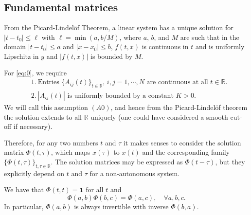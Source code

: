 \documentclass[a4paper,11pt]{article}
\newcounter{Theorem}
\theoremstyle{remark}
\begin{document}

\subsection{Fundamental matrices}


From the Picard-Lindel\"{o}f Theorem, a linear system has a unique solution for $|t-t_0| \le \ell$ with $\ell=\min(a,b/M)$, where $a$, $b$, and $M$ are such that in the domain $|t-t_0|\le a$ and $|x-x_0| \le b$, $f(t,x)$ is continuous in $t$ and is uniformly Lipschitz in $y$ and $|f(t,x)|$ is bounded by $M$. 


For \eqref{eq:0}, we require
\begin{equation} \label{A0} \tag{$A0$}
\begin{aligned}
&1.~\text{Entries $\{A_{ij}(t)\}_{t\in \mathbb{R}}$, $i,j=1,\cdots,N$ are continuous at all $t\in \mathbb{R}$.}\\
&2.~\text{$|A_{ij}(t)|$ is uniformly bounded by a constant $K>0$.}
\end{aligned}
\end{equation}
We will call this assumption $(A0)$, and hence from the Picard-Lindel\"{o}f theorem the solution extends to all $ \mathbb{R}$ uniquely (one could have considered a smooth cut-off if necessary). 

Therefore, for any two numbers $t$ and $\tau$ it makes senses to consider the solution matrix $\Phi(t,\tau)$, which maps $x(\tau)$ to $x(t)$ and the corresponding family $\{\Phi(t,\tau)\}_{t,\tau \in \mathbb{R}}$. The solution matrices may be expressed as $\Phi(t-\tau)$, but  they explicitly depend on $t$ and $\tau$ for a non-autonomous system.

We have that $\Phi(t,t)=\mathbf{1}$ for all $t$ and 
$$\Phi(a,b)\Phi(b,c) = \Phi(a,c), \quad \forall a,b,c.$$
In particular, $\Phi(a,b)$ is always invertible with inverse $\Phi(b,a)$. %
\end{document}
